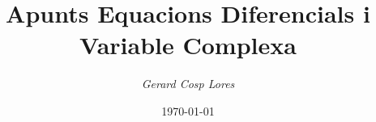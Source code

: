 \documentclass[12pt]{article}
\title{\textbf{Apunts Equacions Diferencials i Variable Complexa}}
\author{\textit{Gerard Cosp Lores}}
\date{\today}
\begin{document}
\justifying

\maketitle
\end{document}
